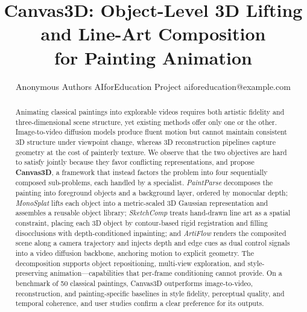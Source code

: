 \documentclass{article}
\title{Canvas3D: Object-Level 3D Lifting and Line-Art Composition\\
for Painting Animation}
\author{
    Anonymous Authors
    \affiliations
    AIforEducation Project
    \emails
    aiforeducation@example.com
}
\begin{document}
\maketitle

\begin{abstract}
Animating classical paintings into explorable videos requires both
artistic fidelity and three-dimensional scene structure, yet existing
methods offer only one or the other. Image-to-video diffusion models
produce fluent motion but cannot maintain consistent 3D structure under
viewpoint change, whereas 3D reconstruction pipelines capture geometry
at the cost of painterly texture. We observe that the two objectives
are hard to satisfy jointly because they favor conflicting
representations, and propose \textbf{Canvas3D}, a framework that
instead factors the problem into four sequentially composed
sub-problems, each handled by a specialist. \emph{PaintParse}
decomposes the painting into foreground objects and a background layer,
ordered by monocular depth; \emph{MonoSplat} lifts each object into a
metric-scaled 3D Gaussian representation and assembles a reusable
object library; \emph{SketchComp} treats hand-drawn line art as a
spatial constraint, placing each 3D object by contour-based rigid
registration and filling disocclusions with depth-conditioned
inpainting; and \emph{ArtiFlow} renders the composited scene along a
camera trajectory and injects depth and edge cues as dual control
signals into a video diffusion backbone, anchoring motion to explicit
geometry. The decomposition supports object repositioning, multi-view
exploration, and style-preserving animation---capabilities that
per-frame conditioning cannot provide. On a benchmark of 50 classical
paintings, Canvas3D outperforms image-to-video, reconstruction, and
painting-specific baselines in style fidelity, perceptual quality, and
temporal coherence, and user studies confirm a clear preference for its
outputs.
\end{abstract}









\end{document}
